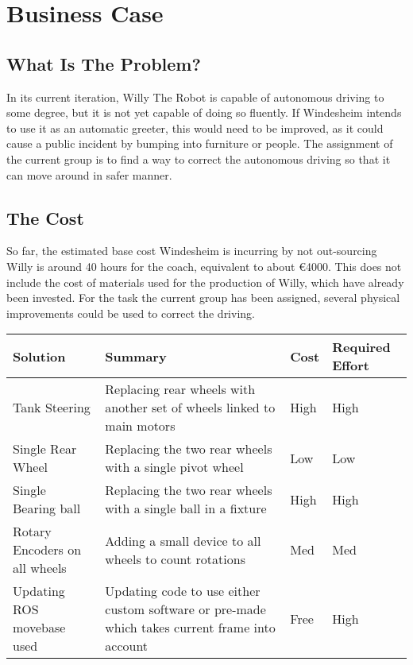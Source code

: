 \section{Business Case}


\subsection{What Is The Problem?}
In its current iteration, Willy The Robot is capable of autonomous driving to some degree, but it is not yet capable of doing so fluently.
If Windesheim intends to use it as an automatic greeter, this would need to be improved, as it could cause a public incident by bumping into furniture or people.
The assignment of the current group is to find a way to correct the autonomous driving so that it can move around in safer manner.

\subsection{The Cost}
So far, the estimated base cost Windesheim is incurring by not out-sourcing Willy is around 40 hours for the coach, equivalent to about \euro 4000.
This does not include the cost of materials used for the production of Willy, which have already been invested.
For the task the current group has been assigned, several physical improvements could be used to correct the driving.

\begin{tabular}{|L{3cm}|L{6cm}|l|l|}
\hline
Solution		  & Summary 															  & Cost 	&Required Effort \\ \hline
Tank Steering & Replacing rear wheels with another set of wheels linked to main motors & High 	& High			\\ \hline
Single Rear Wheel & Replacing the two rear wheels with a single pivot wheel 		    	  & Low		& Low			\\ \hline
Single Bearing ball & Replacing the two rear wheels with a single ball in a fixture   & High  	& High			\\ \hline
Rotary Encoders on all wheels & Adding a small device to all wheels to count rotations & Med   	& Med			\\ \hline
Updating ROS movebase used & Updating code to use either custom software or pre-made which takes current frame into account & Free & High \\ \hline
\end{tabular}


